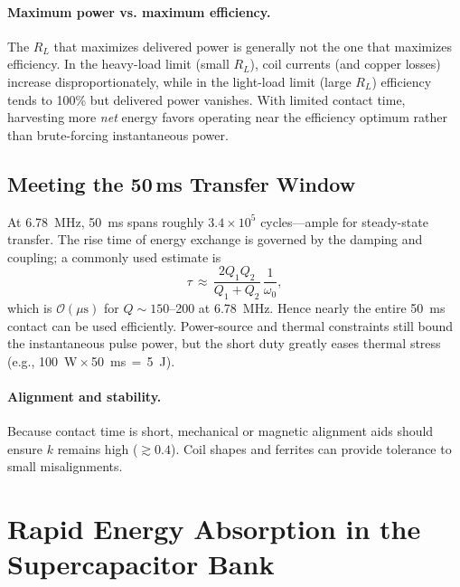 \documentclass[11pt]{article}
\begin{document}
\paragraph{Maximum power vs. maximum efficiency.} The $R_L$ that maximizes delivered power is generally not the one that maximizes efficiency. In the heavy-load limit (small $R_L$), coil currents (and copper losses) increase disproportionately, while in the light-load limit (large $R_L$) efficiency tends to 100\% but delivered power vanishes. With limited contact time, harvesting more \emph{net} energy favors operating near the efficiency optimum rather than brute-forcing instantaneous power.

\subsection{Meeting the 50\,ms Transfer Window}
At 6.78~MHz, 50~ms spans roughly $3.4\times10^5$ cycles---ample for steady-state transfer. The rise time of energy exchange is governed by the damping and coupling; a commonly used estimate is
\begin{equation}
  \tau \,\approx\, \frac{2 Q_1 Q_2}{Q_1+Q_2}\,\frac{1}{\omega_0},
\end{equation}
which is $\mathcal{O}(\mu\mathrm{s})$ for $Q\sim150$--200 at 6.78~MHz. Hence nearly the entire 50~ms contact can be used efficiently. Power-source and thermal constraints still bound the instantaneous pulse power, but the short duty greatly eases thermal stress (e.g., 100~W\,$\times$\,50~ms\,$=\,$5~J).

\paragraph{Alignment and stability.} Because contact time is short, mechanical or magnetic alignment aids should ensure $k$ remains high ($\gtrsim0.4$). Coil shapes and ferrites can provide tolerance to small misalignments.

\section{Rapid Energy Absorption in the Supercapacitor Bank}
\end{document}
